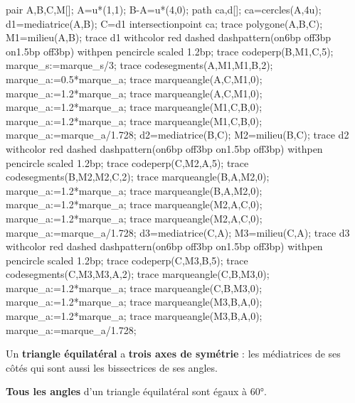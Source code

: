 \begin{changemargin}{0mm}{-25mm}
\begin{minipage}{0.22\linewidth}
    \begin{Geometrie}[CoinBG={(0.5u,0.5u)},CoinHD={(5.5u,5u)}]
        pair A,B,C,M[];
        A=u*(1,1);
        B-A=u*(4,0);
        path ca,d[];
        ca=cercles(A,4u);
        d1=mediatrice(A,B);
        C=d1 intersectionpoint ca;
        trace polygone(A,B,C);
        M1=milieu(A,B);
        trace d1 withcolor red dashed dashpattern(on6bp off3bp on1.5bp off3bp) withpen pencircle scaled 1.2bp;
        trace codeperp(B,M1,C,5);
        marque_s:=marque_s/3;
        trace codesegments(A,M1,M1,B,2);        
        marque_a:=0.5*marque_a;
        trace marqueangle(A,C,M1,0);        
        marque_a:=1.2*marque_a;
        trace marqueangle(A,C,M1,0);
        marque_a:=1.2*marque_a;
        trace marqueangle(M1,C,B,0);
        marque_a:=1.2*marque_a;
        trace marqueangle(M1,C,B,0);
        marque_a:=marque_a/1.728;
        d2=mediatrice(B,C);
        M2=milieu(B,C);
        trace d2 withcolor red dashed dashpattern(on6bp off3bp on1.5bp off3bp) withpen pencircle scaled 1.2bp;
        trace codeperp(C,M2,A,5);
        trace codesegments(B,M2,M2,C,2);        
        trace marqueangle(B,A,M2,0);
        marque_a:=1.2*marque_a;
        trace marqueangle(B,A,M2,0);
        marque_a:=1.2*marque_a;
        trace marqueangle(M2,A,C,0);
        marque_a:=1.2*marque_a;
        trace marqueangle(M2,A,C,0);
        marque_a:=marque_a/1.728;
        d3=mediatrice(C,A);
        M3=milieu(C,A);
        trace d3 withcolor red dashed dashpattern(on6bp off3bp on1.5bp off3bp) withpen pencircle scaled 1.2bp;
        trace codeperp(C,M3,B,5);
        trace codesegments(C,M3,M3,A,2);        
        trace marqueangle(C,B,M3,0);
        marque_a:=1.2*marque_a;
        trace marqueangle(C,B,M3,0);
        marque_a:=1.2*marque_a;
        trace marqueangle(M3,B,A,0);
        marque_a:=1.2*marque_a;
        trace marqueangle(M3,B,A,0);
        marque_a:=marque_a/1.728;
    \end{Geometrie}
\end{minipage}
\begin{minipage}{0.63\linewidth}
    \begin{propriete}[\admise]
        Un \textbf{triangle équilatéral} a \textbf{trois axes de symétrie} : les médiatrices de ses côtés qui sont aussi les bissectrices de ses angles.
    \end{propriete}

    \begin{remarque}

        \textbf{Tous les angles} d'un triangle équilatéral sont égaux à \ang{60}.
    \end{remarque}
\end{minipage}
\end{changemargin}
